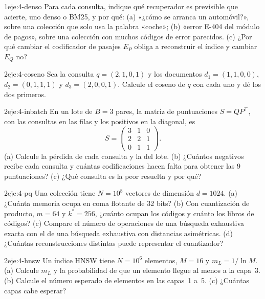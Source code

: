 \begin{ejercicio}{1}{eje:4-denso}
Para cada consulta, indique qué recuperador es previsible que acierte, uno denso o BM25, y por qué: (a) «¿cómo se arranca un automóvil?», sobre una colección que solo usa la palabra «coche»; (b) «error E-404 del módulo de pagos», sobre una colección con muchos códigos de error parecidos. (c) ¿Por qué cambiar el codificador de pasajes $E_P$ obliga a reconstruir el índice y cambiar $E_Q$ no?
\end{ejercicio}

\begin{ejercicio}{2}{eje:4-coseno}
Sea la consulta $q=(2,1,0,1)$ y los documentos $d_1=(1,1,0,0)$, $d_2=(0,1,1,1)$ y $d_3=(2,0,0,1)$. Calcule el coseno de $q$ con cada uno y dé los dos primeros.
\end{ejercicio}

\begin{ejercicio}{2}{eje:4-inbatch}
En un lote de $B=3$ pares, la matriz de puntuaciones $S=QP^{\top}$, con las consultas en las filas y los positivos en la diagonal, es
\[
S=\begin{pmatrix}3&1&0\\2&2&1\\0&1&1\end{pmatrix}.
\]
(a) Calcule la pérdida de cada consulta y la del lote. (b) ¿Cuántos negativos recibe cada consulta y cuántas codificaciones hacen falta para obtener las 9 puntuaciones? (c) ¿Qué consulta es la peor resuelta y por qué?
\end{ejercicio}

\begin{ejercicio}{2}{eje:4-pq}
Una colección tiene $N=10^{8}$ vectores de dimensión $d=1024$. (a) ¿Cuánta memoria ocupa en coma flotante de 32 bits? (b) Con cuantización de producto, $m=64$ y $k^\ast=256$, ¿cuánto ocupan los códigos y cuánto los libros de códigos? (c) Compare el número de operaciones de una búsqueda exhaustiva exacta con el de una búsqueda exhaustiva con distancias asimétricas. (d) ¿Cuántas reconstrucciones distintas puede representar el cuantizador?
\end{ejercicio}

\begin{ejercicio}{2}{eje:4-hnsw}
Un índice HNSW tiene $N=10^{6}$ elementos, $M=16$ y $m_L=1/\ln M$. (a) Calcule $m_L$ y la probabilidad de que un elemento llegue al menos a la capa~3. (b) Calcule el número esperado de elementos en las capas~1 a~5. (c) ¿Cuántas capas cabe esperar?
\end{ejercicio}


